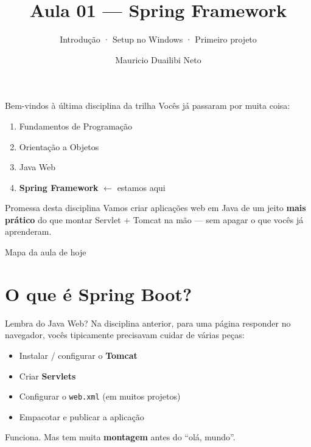 \documentclass[aspectratio=169,11pt]{beamer}
\title{Aula 01 --- Spring Framework}
\subtitle{Introdução · Setup no Windows · Primeiro projeto}
\author{Mauricio Duailibi Neto}
\institute{Entra21}
\date{}
\begin{document}
\begin{frame}
  \titlepage
\end{frame}

\begin{frame}{Bem-vindos à última disciplina da trilha}
  Vocês já passaram por muita coisa:

  \vspace{0.5em}
  \begin{enumerate}
    \item Fundamentos de Programação
    \item Orientação a Objetos
    \item Java Web
    \item \textbf{Spring Framework} $\leftarrow$ estamos aqui
  \end{enumerate}

  \vspace{0.8em}
  \begin{block}{Promessa desta disciplina}
    Vamos criar aplicações web em Java de um jeito \textbf{mais prático}
    do que montar Servlet + Tomcat na mão --- sem apagar o que vocês
    já aprenderam.
  \end{block}
\end{frame}

\begin{frame}{Mapa da aula de hoje}
  \tableofcontents
\end{frame}

\section{O que é Spring Boot?}

\begin{frame}{Lembra do Java Web?}
  Na disciplina anterior, para uma página responder no navegador, vocês
  tipicamente precisavam cuidar de várias peças:

  \vspace{0.6em}
  \begin{itemize}
    \item Instalar / configurar o \textbf{Tomcat}
    \item Criar \textbf{Servlets}
    \item Configurar o \texttt{web.xml} (em muitos projetos)
    \item Empacotar e publicar a aplicação
  \end{itemize}

  \vspace{0.6em}
  Funciona. Mas tem muita \textbf{montagem} antes do “olá, mundo”.
\end{frame}
\end{document}
